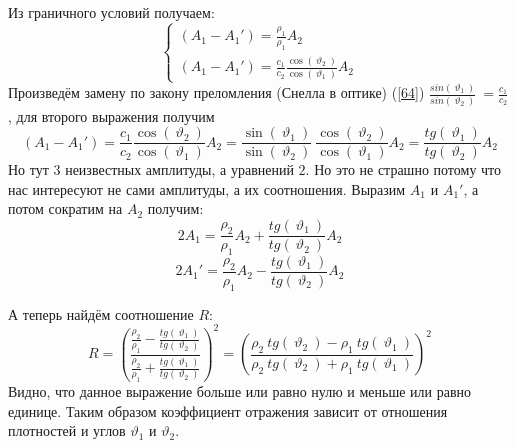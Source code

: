 \documentclass[14pt,a4paper,oneside]{extarticle}	%
\newcommand{\bracket}[1] {\left( #1 \right) } %
\begin{document}
Из граничного условий получаем:
\begin{equation*}
\begin{cases}
\bracket{A_{1}-A_{1}'} = \frac{\rho_{1}}{\rho_{1}} A_{2} \\
\bracket{A_{1}-A_{1}'}= \frac{c_{1}}{c_{2}}\frac{\cos(\:\vartheta_{2}\:)}{\cos(\:\vartheta_{1}\:)}A_{2} 
\end{cases}
\end{equation*} 
Произведём замену по закону преломления (Снелла в оптике) (\ref{64}) $ \frac{sin(\: \vartheta_{1}\:)}{sin(\: \vartheta_{2}\:)}\:  = \frac{c_{1}}{c_{2}}\:  $, для второго выражения получим  
\begin{equation*}
\bracket{A_{1}-A_{1}'}= \frac{c_{1}}{c_{2}}\frac{\cos(\:\vartheta_{2}\:)}{\cos(\:\vartheta_{1}\:)}A_{2} = \frac{\sin(\: \vartheta_{1}\:)}{\sin(\: \vartheta_{2}\:)}\:\frac{\cos(\:\vartheta_{2}\:)}{\cos(\:\vartheta_{1}\:)}A_{2} = \frac{tg(\:\vartheta_{1}\:)}{tg(\:\vartheta_{2}\:)}A_{2}
\end{equation*}
Но тут $ 3 $ неизвестных амплитуды, а уравнений $ 2 $. Но это не страшно потому что нас интересуют не сами амплитуды, а их соотношения.
Выразим $ A_{1} $ и $ A_{1}' $, а потом сократим на $ A_{2} $
получим:
\begin{equation*}
2A_{1} = \frac{\rho_{2}}{\rho_{1}}  A_{2} + \frac{tg(\:\vartheta_{1}\:)}{tg(\:\vartheta_{2}\:)}A_{2}
\end{equation*}
\begin{equation*}
2A_{1}' = \frac{\rho_{2}}{\rho_{1}}  A_{2} - \frac{tg(\:\vartheta_{1}\:)}{tg(\:\vartheta_{2}\:)}A_{2}
\end{equation*}

А теперь найдём соотношение $ R $:
\begin{equation*}
R = \bracket{\frac{\frac{\rho_{2}}{\rho_{1}} - \frac{tg(\:\vartheta_{1}\:)}{tg(\:\vartheta_{2}\:)}}{ \frac{\rho_{2}}{\rho_{1}} + \frac{tg(\:\vartheta_{1}\:)}{tg(\:\vartheta_{2}\:)}}}^{2} = \bracket{\frac{\rho_{2}\:tg(\:\vartheta_{2}\:) - \rho_{1}\:tg(\:\vartheta_{1}\:)}{\rho_{2}\:tg(\:\vartheta_{2}\:) + \rho_{1}\:tg(\:\vartheta_{1}\:)}}^{2}
\end{equation*}
Видно, что данное выражение больше или равно нулю и меньше или равно единице.
Таким образом коэффициент отражения зависит от отношения плотностей и углов $ \vartheta_{1} $ и $ \vartheta_{2} $.
\end{document}
